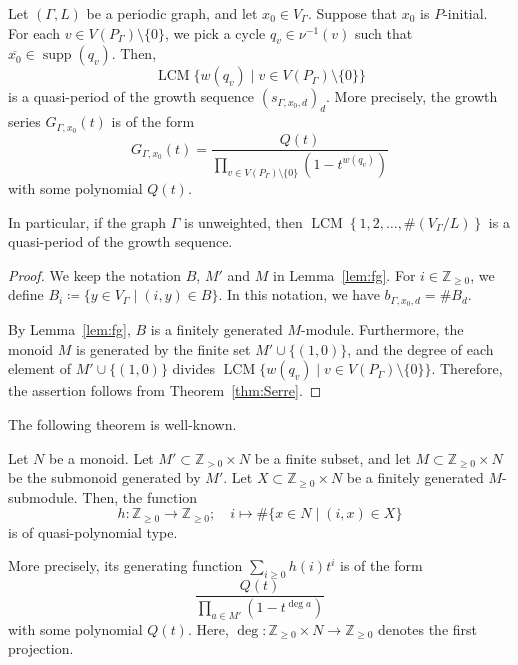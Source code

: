 \documentclass[ALCO,published]{cedram}
\theoremstyle{remark}
\begin{document}
\begin{thm}\label{thm:Piniqp}
Let $(\Gamma, L)$ be a periodic graph, and let $x_0 \in V_{\Gamma}$. Suppose that $x_0$ is $P$-initial. 
For each $v \in V(P_{\Gamma}) \setminus \{ 0 \}$, we pick a cycle $q_v \in \nu^{-1}(v)$ such that 
$\overline{x_0} \in \operatorname{supp}(q_v)$. 
Then, 
\[
\operatorname{LCM} \{ w(q_v) \mid v \in V(P_{\Gamma}) \setminus \{0\} \}
\]
is a quasi-period of the growth sequence $(s_{\Gamma, x_0, d})_d$. 
More precisely, the growth series $G_{\Gamma, x_0}(t)$ is of the form
\[
G_{\Gamma, x_0}(t) = \frac{Q(t)}{\prod _{v \in V(P_{\Gamma}) \setminus \{ 0 \}} (1-t^{w(q_v)})}
\]
with some polynomial $Q(t)$. 

In particular, if the graph $\Gamma$ is unweighted, 
then $\operatorname{LCM} \left \{ 1, 2, \ldots, \#(V_{\Gamma}/L) \right \}$ is 
a quasi-period of the growth sequence. 
\end{thm}

\begin{proof}
We keep the notation $B$, $M'$ and $M$ in Lemma~\ref{lem:fg}. 
For $i \in \mathbb{Z}_{\ge 0}$, 
we define $B_i \coloneqq  \{ y \in V_{\Gamma} \mid (i,y) \in B \}$. 
In this notation, we have $b_{\Gamma, x_0, d} = \# B_d$. 

By Lemma~\ref{lem:fg}, $B$ is a finitely generated $M$-module. 
Furthermore, the monoid $M$ is generated by the finite set $M' \cup \{ (1,0) \}$, 
and the degree of each element of $M' \cup \{ (1,0) \}$ divides 
$\operatorname{LCM} \{ w(q_v) \mid v \in V(P_{\Gamma}) \setminus \{0\} \}$. 
Therefore, the assertion follows from Theorem~\ref{thm:Serre}.   
\end{proof}

\noindent
The following theorem is well-known. 
\begin{thm}[{cf.~\cite[Theorem 6.38]{BG2009}}]\label{thm:Serre}
Let $N$ be a monoid. 
Let $M' \subset \mathbb{Z}_{> 0} \times N$ be a finite subset, and 
let $M \subset \mathbb{Z}_{\ge 0} \times N$ be the submonoid generated by $M'$. 
Let $X \subset \mathbb{Z}_{\ge 0} \times N$ be a finitely generated $M$-submodule. 
Then, the function 
\[
h: \mathbb{Z}_{\ge 0} \to \mathbb{Z}_{\ge 0}; \quad  i \mapsto \# \{ x \in N \mid (i,x) \in X \}
\]
is of quasi-polynomial type. 

More precisely, 
its generating function $\sum _{i \ge 0} h(i) t^i$ is of the form 
\[
\frac{Q(t)}{\prod _{a \in M'} (1 - t^{\deg a})}
\]
with some polynomial $Q(t)$. 
Here, $\deg : \mathbb{Z}_{\ge 0} \times N \to \mathbb{Z}_{\ge 0}$ denotes the first projection.
\end{thm}
\end{document}
